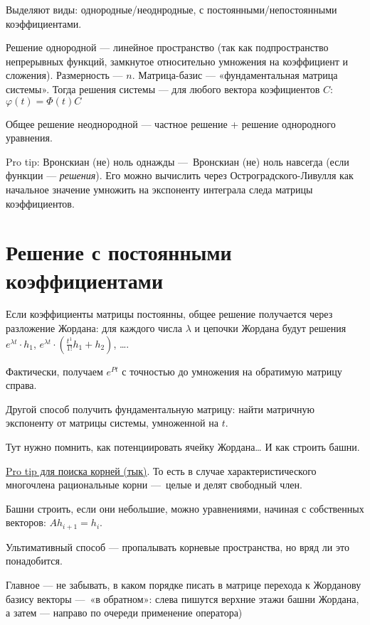 \documentclass[12pt, a4paper]{article}
\begin{document}
Выделяют виды: однородные/неоднродные, с постоянными/непостоянными коэффициентами.

Решение однородной — линейное пространство (так как подпространство непрерывных функций, замкнутое относительно умножения на коэффициент и сложения).
Размерность — $n$. Матрица-базис — «фундаментальная матрица системы».
Тогда решения системы — для любого вектора коэфициентов $C$: $\varphi(t) = \Phi(t) C$

Общее решение неоднородной — частное решение + решение однородного уравнения.

Pro tip: Вронскиан (не) ноль однажды — Вронскиан (не) ноль навсегда (если функции — \textit{решения}).
Его можно вычислить через Остроградского-Ливулля как начальное значение умножить на экспоненту интеграла следа матрицы коэффициентов.

\section{Решение с постоянными коэффициентами}

Если коэффициенты матрицы постоянны, общее решение получается через разложение Жордана: для каждого числа $\lambda$ и цепочки Жордана будут решения
$e^{\lambda t} \cdot h_1$, $e^{\lambda t} \cdot (\frac{t^{1}}{1!} h_1 + h_2)$, ….

Фактически, получаем $e^{Pt}$ с точностью до умножения на обратимую матрицу справа.

Другой способ получить фундаментальную матрицу: найти матричную экспоненту от матрицы системы, умноженной на $t$.

Тут нужно помнить, как потенциировать ячейку Жордана… И как строить башни.

\href{https://ru.wikipedia.org/wiki/%D0%A2%D0%B5%D0%BE%D1%80%D0%B5%D0%BC%D0%B0_%D0%BE_%D1%80%D0%B0%D1%86%D0%B8%D0%BE%D0%BD%D0%B0%D0%BB%D1%8C%D0%BD%D1%8B%D1%85_%D0%BA%D0%BE%D1%80%D0%BD%D1%8F%D1%85}{Pro tip для поиска корней (тык)}.
То есть в случае характеристического многочлена рациональные корни — целые и делят свободный член.

Башни строить, если они небольшие, можно уравнениями, начиная с собственных векторов: $A h_{i + 1} = h_i$.

Ультимативный способ — пропалывать корневые пространства, но вряд ли это понадобится.

Главное — не забывать, 
в каком порядке писать в матрице перехода к Жорданову базису векторы — «в обратном»: 
слева пишутся верхние этажи башни Жордана, 
а затем — направо по очереди применение оператора)
\end{document}
